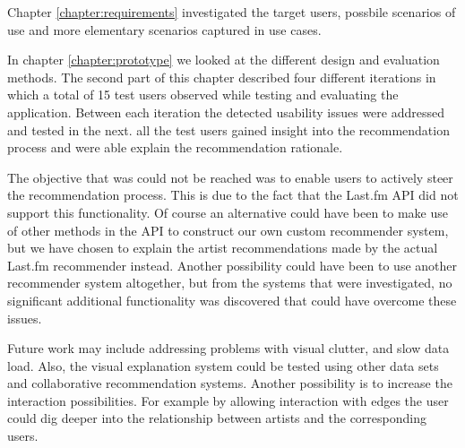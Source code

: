 Chapter \ref{chapter:requirements} investigated the target users, possbile scenarios of use and more elementary scenarios captured in use cases.

In chapter \ref{chapter:prototype} we looked at the different design and evaluation methods. The second part of this chapter described four different iterations in which a total of 15 test users observed while testing and evaluating the application. Between each iteration the detected usability issues were addressed and tested in the next. all the test users gained insight into the recommendation process and were able explain the recommendation rationale.

The objective that was could not be reached was to enable users to actively steer the recommendation process. This is due to the fact that the Last.fm API did not support this functionality. Of course an alternative could have been to make use of other methods in the API to construct our own custom recommender system, but we have chosen to explain the artist recommendations made by the actual Last.fm recommender instead. Another possibility could have been to use another recommender system altogether, but from the systems that were investigated, no significant additional functionality was discovered that could have overcome these issues.

Future work may include addressing problems with visual clutter, and slow data load. Also, the visual explanation system could be tested using other data sets and collaborative recommendation systems. Another possibility is to increase the interaction possibilities. For example by allowing interaction with edges the user could dig deeper into the relationship between artists and the corresponding users.






